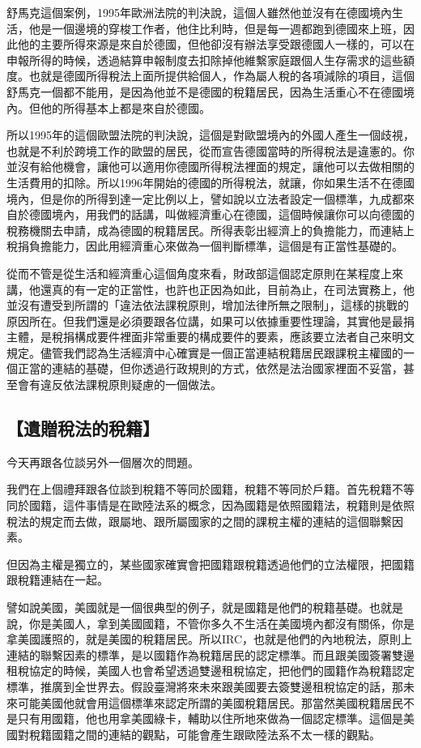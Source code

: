 \documentclass[oneside,sub3section]{ctexbook}
\begin{document}
舒馬克這個案例，1995年歐洲法院的判決說，這個人雖然他並沒有在德國境內生活，他是一個邊境的穿梭工作者，他住比利時，但是每一週都跑到德國來上班，因此他的主要所得來源是來自於德國，但他卻沒有辦法享受跟德國人一樣的，可以在申報所得的時候，透過結算申報制度去扣除掉他維繫家庭跟個人生存需求的這些額度。也就是德國所得稅法上面所提供給個人，作為屬人稅的各項減除的項目，這個舒馬克一個都不能用，是因為他並不是德國的稅籍居民，因為生活重心不在德國境內。但他的所得基本上都是來自於德國。

所以1995年的這個歐盟法院的判決說，這個是對歐盟境內的外國人產生一個歧視，也就是不利於跨境工作的歐盟的居民，從而宣告德國當時的所得稅法是違憲的。你並沒有給他機會，讓他可以適用你德國所得稅法裡面的規定，讓他可以去做相關的生活費用的扣除。所以1996年開始的德國的所得稅法，就讓，你如果生活不在德國境內，但是你的所得到達一定比例以上，譬如說以立法者設定一個標準，九成都來自於德國境內，用我們的話講，叫做經濟重心在德國，這個時候讓你可以向德國的稅務機關去申請，成為德國的稅籍居民。所得表彰出經濟上的負擔能力，而連結上稅捐負擔能力，因此用經濟重心來做為一個判斷標準，這個是有正當性基礎的。

從而不管是從生活和經濟重心這個角度來看，財政部這個認定原則在某程度上來講，他還真的有一定的正當性，也許也正因為如此，目前為止，在司法實務上，他並沒有遭受到所謂的「違法依法課稅原則，增加法律所無之限制」，這樣的挑戰的原因所在。但我們還是必須要跟各位講，如果可以依據重要性理論，其實他是最捐主體，是稅捐構成要件裡面非常重要的構成要件的要素，應該要立法者自己來明文規定。儘管我們認為生活經濟中心確實是一個正當連結稅籍居民跟課稅主權國的一個正當的連結的基礎，但你透過行政規則的方式，依然是法治國家裡面不妥當，甚至會有違反依法課稅原則疑慮的一個做法。

\hypertarget{ux907aux8d08ux7a05ux6cd5ux7684ux7a05ux7c4d}{%
\subsection{【遺贈稅法的稅籍】}\label{ux907aux8d08ux7a05ux6cd5ux7684ux7a05ux7c4d}}

今天再跟各位談另外一個層次的問題。

我們在上個禮拜跟各位談到稅籍不等同於國籍，稅籍不等同於戶籍。首先稅籍不等同於國籍，這件事情是在歐陸法系的概念，因為國籍是依照國籍法，稅籍則是依照稅法的規定而去做，跟屬地、跟所屬國家的之間的課稅主權的連結的這個聯繫因素。

但因為主權是獨立的，某些國家確實會把國籍跟稅籍透過他們的立法權限，把國籍跟稅籍連結在一起。

譬如說美國，美國就是一個很典型的例子，就是國籍是他們的稅籍基礎。也就是說，你是美國人，拿到美國國籍，不管你多久不生活在美國境內都沒有關係，你是拿美國護照的，就是美國的稅籍居民。所以IRC，也就是他們的內地稅法，原則上連結的聯繫因素的標準，是以國籍作為稅籍居民的認定標準。而且跟美國簽署雙邊租稅協定的時候，美國人也會希望透過雙邊租稅協定，把他們的國籍作為稅籍認定標準，推廣到全世界去。假設臺灣將來未來跟美國要去簽雙邊租稅協定的話，那未來可能美國他就會用這個標準來認定所謂的美國稅籍居民。那當然美國稅籍居民不是只有用國籍，他也用拿美國綠卡，輔助以住所地來做為一個認定標準。這個是美國對稅籍國籍之間的連結的觀點，可能會產生跟歐陸法系不太一樣的觀點。
\end{document}
